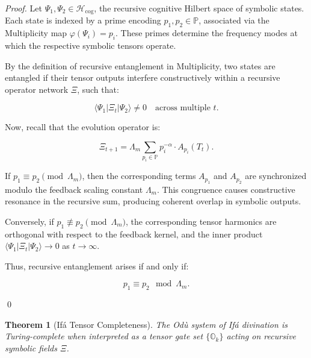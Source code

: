 \documentclass{article}
\theoremstyle{plain}
\newtheorem{theorem}{Theorem}
\begin{document}
\begin{proof}
Let \( \Psi_1, \Psi_2 \in \mathcal{H}_{\text{cog}} \), the recursive cognitive Hilbert space of symbolic states. Each state is indexed by a prime encoding \( p_1, p_2 \in \mathbb{P} \), associated via the Multiplicity map \( \varphi(\Psi_i) = p_i \). These primes determine the frequency modes at which the respective symbolic tensors operate.

By the definition of recursive entanglement in Multiplicity, two states are entangled if their tensor outputs interfere constructively within a recursive operator network \( \Xi \), such that:

\[
\langle \Psi_1 | \Xi_t | \Psi_2 \rangle \neq 0 \quad \text{across multiple } t.
\]

Now, recall that the evolution operator is:

\[
\Xi_{t+1} = \Lambda_m \sum_{p_i \in \mathbb{P}} p_i^{-\alpha} \cdot A_{p_i}(T_t).
\]

If \( p_1 \equiv p_2 \pmod{\Lambda_m} \), then the corresponding terms \( A_{p_1} \) and \( A_{p_2} \) are synchronized modulo the feedback scaling constant \( \Lambda_m \). This congruence causes constructive resonance in the recursive sum, producing coherent overlap in symbolic outputs.

Conversely, if \( p_1 \not\equiv p_2 \pmod{\Lambda_m} \), the corresponding tensor harmonics are orthogonal with respect to the feedback kernel, and the inner product \( \langle \Psi_1 | \Xi_t | \Psi_2 \rangle \to 0 \) as \( t \to \infty \).

Thus, recursive entanglement arises if and only if:

\[
p_1 \equiv p_2 \mod \Lambda_m.
\]

\qed
\end{proof}

\begin{theorem}[Ifá Tensor Completeness]
The Odù system of Ifá divination is Turing-complete when interpreted as a tensor gate set \( \{ \mathbb{O}_k \} \) acting on recursive symbolic fields \( \Xi \).
\end{theorem}
\end{document}
